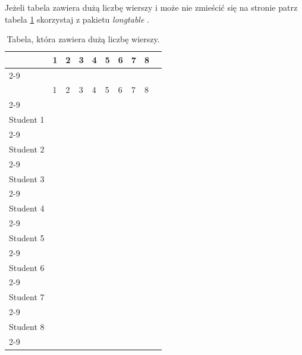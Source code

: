 Jeżeli tabela zawiera dużą liczbę wierszy i może nie zmieścić się na stronie \pauza patrz tabela \ref{tab:longtable} \pauza skorzystaj z pakietu \emph{longtable} \cite{longtable}.
\begin{longtable}{|p{14ex}|p{1.5em}|p{1.5em}|p{1.5em}|p{1.5em}|p{1.5em}|p{1.5em}|p{1.5em}|p{1.5em}|p{1.5em}|}
    \caption{Tabela, która zawiera dużą liczbę wierszy\label{tab:longtable}.}
    \endfirsthead
    \hline
               & 1 & 2 & 3 & 4 & 5 & 6 & 7 & 8 & \\
    \cline{2-9}
               &   &   &   &   &   &   &   &   & \\
    \hline
    \endhead
    \endfoot
    \hline\hline
               & 1 & 2 & 3 & 4 & 5 & 6 & 7 & 8 & \\
    \cline{2-9}
               &   &   &   &   &   &   &   &   & \\
    \hline\hline
    Student 1  &   &   &   &   &   &   &   &   & \\
    \cline{2-9}
               &   &   &   &   &   &   &   &   & \\
    \hline\hline
    Student 2  &   &   &   &   &   &   &   &   & \\
    \cline{2-9}
               &   &   &   &   &   &   &   &   & \\
    \hline\hline
    Student 3  &   &   &   &   &   &   &   &   & \\
    \cline{2-9}
               &   &   &   &   &   &   &   &   & \\
    \hline\hline
    Student 4  &   &   &   &   &   &   &   &   & \\
    \cline{2-9}
               &   &   &   &   &   &   &   &   & \\
    \hline\hline
    Student 5  &   &   &   &   &   &   &   &   & \\
    \cline{2-9}
               &   &   &   &   &   &   &   &   & \\
    \hline\hline
    Student 6  &   &   &   &   &   &   &   &   & \\
    \cline{2-9}
               &   &   &   &   &   &   &   &   & \\
    \hline\hline
    Student 7  &   &   &   &   &   &   &   &   & \\
    \cline{2-9}
               &   &   &   &   &   &   &   &   & \\
    \hline\hline
     Student 8  &   &   &   &   &   &   &   &   & \\
     \cline{2-9}
                &   &   &   &   &   &   &   &   & \\

\end{longtable}
